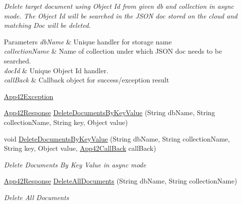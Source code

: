 \begin{DoxyCompactItemize}
\begin{DoxyCompactList}\small\item\em Delete target document using Object Id from given db and collection in async mode. The Object Id will be searched in the J\+S\+O\+N doc stored on the cloud and matching Doc will be deleted. 
\begin{DoxyParams}{Parameters}
{\em db\+Name} & Unique handler for storage name\\
\hline
{\em collection\+Name} & Name of collection under which J\+S\+O\+N doc needs to be searched.\\
\hline
{\em doc\+Id} & Unique Object Id handler.\\
\hline
{\em call\+Back} & Callback object for success/exception result\\
\hline
\end{DoxyParams}
\hyperlink{classcom_1_1shephertz_1_1app42_1_1paas_1_1sdk_1_1csharp_1_1_app42_exception}{App42\+Exception}\end{DoxyCompactList}\item 
\hyperlink{classcom_1_1shephertz_1_1app42_1_1paas_1_1sdk_1_1csharp_1_1_app42_response}{App42\+Response} \hyperlink{classcom_1_1shephertz_1_1app42_1_1paas_1_1sdk_1_1csharp_1_1storage_1_1_storage_service_ae1283e347274c9000cef3bacd16cbd56}{Delete\+Documents\+By\+Key\+Value} (String db\+Name, String collection\+Name, String key, Object value)
\item 
void \hyperlink{classcom_1_1shephertz_1_1app42_1_1paas_1_1sdk_1_1csharp_1_1storage_1_1_storage_service_ab01ca93bec41a6918e90a897225b7e0c}{Delete\+Documents\+By\+Key\+Value} (String db\+Name, String collection\+Name, String key, Object value, \hyperlink{interfacecom_1_1shephertz_1_1app42_1_1paas_1_1sdk_1_1csharp_1_1_app42_call_back}{App42\+Call\+Back} call\+Back)
\begin{DoxyCompactList}\small\item\em Delete Documents By Key Value in async mode \end{DoxyCompactList}\item 
\hyperlink{classcom_1_1shephertz_1_1app42_1_1paas_1_1sdk_1_1csharp_1_1_app42_response}{App42\+Response} \hyperlink{classcom_1_1shephertz_1_1app42_1_1paas_1_1sdk_1_1csharp_1_1storage_1_1_storage_service_ab5e48dbc19387a0eac60946c6b4e2c9e}{Delete\+All\+Documents} (String db\+Name, String collection\+Name)
\begin{DoxyCompactList}\small\item\em Delete All Documents \end{DoxyCompactList}\item 

\end{DoxyCompactItemize}
